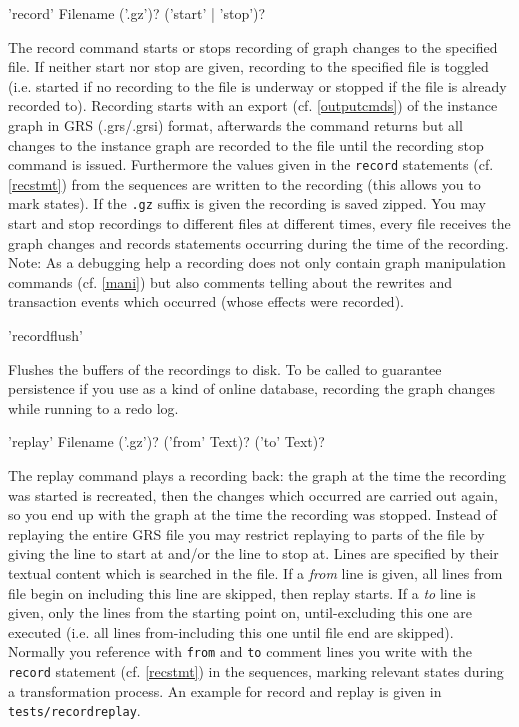\begin{rail}
  'record' Filename ('.gz')? ('start' | 'stop')?
\end{rail}
The record command starts or stops recording of graph changes to the specified file. If neither start nor stop are given, recording to the specified file is toggled (i.e. started if no recording to the file is underway or stopped if the file is already recorded to).
Recording starts with an export (cf. \ref{outputcmds}) of the instance graph in GRS (.grs/.grsi) format, afterwards the command returns but all changes to the instance graph are recorded to the file until the recording stop command is issued.
Furthermore the values given in the \texttt{record} statements (cf. \ref{recstmt}) from the sequences are written to the recording (this allows you to mark states).
If the \texttt{.gz} suffix is given the recording is saved zipped.
You may start and stop recordings to different files at different times, every file receives the graph changes and records statements occurring during the time of the recording.
Note: As a debugging help a recording does not only contain graph manipulation commands (cf. \ref{mani}) but also comments telling about the rewrites and transaction events which occurred (whose effects were recorded).

\begin{rail}
  'recordflush'
\end{rail}
Flushes the buffers of the recordings to disk. 
To be called to guarantee persistence if you use \GrG{} as a kind of online database, recording the graph changes while running to a redo log.

\begin{rail}
  'replay' Filename ('.gz')? ('from' Text)? ('to' Text)?
\end{rail}
The replay command plays a recording back: the graph at the time the recording was started is recreated, then the changes which occurred are carried out again, so you end up with the graph at the time the recording was stopped. Instead of replaying the entire GRS file you may restrict replaying to parts of the file by giving the line to start at and/or the line to stop at. Lines are specified by their textual content which is searched in the file.
If a \emph{from} line is given, all lines from file begin on including this line are skipped, then replay starts. If a \emph{to} line is given, only the lines from the starting point on, until-excluding this one are executed (i.e. all lines from-including this one until file end are skipped).
Normally you reference with \texttt{from} and \texttt{to} comment lines you write with the \texttt{record} statement (cf. \ref{recstmt}) in the sequences, marking relevant states during a transformation process.
An example for record and replay is given in \texttt{tests/recordreplay}.


